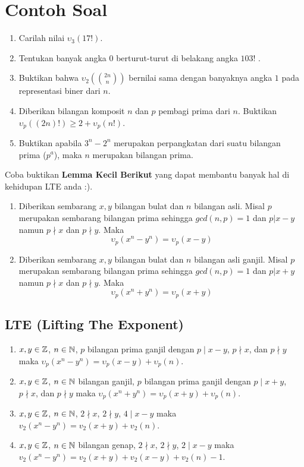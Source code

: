 \documentclass[12pt]{scrartcl}
\begin{document}
\section{Contoh Soal}
\begin{enumerate}
    \item Carilah nilai $\upsilon_3(17!)$.
    \item Tentukan banyak angka 0 berturut-turut di belakang angka $103!$ .
    \item Buktikan bahwa $\upsilon_2(\binom{2n}{n})$ bernilai sama dengan banyaknya angka $1$ pada representasi biner dari $n$.
    \item Diberikan bilangan komposit $n$ dan $p$ pembagi prima dari $n$. Buktikan $\upsilon_p((2n)!) \geq 2+\upsilon_p(n!)$.
    \item Buktikan apabila $3^n-2^n$ merupakan perpangkatan dari suatu bilangan prima ($p^a$), maka $n$ merupakan bilangan prima.
\end{enumerate}

Coba buktikan \textbf{Lemma Kecil Berikut} yang dapat membantu banyak hal di kehidupan LTE anda :).

\begin{enumerate}[resume]
    \item Diberikan sembarang $x,y$ bilangan bulat dan $n$ bilangan asli. Misal $p$ merupakan sembarang bilangan prima sehingga $gcd(n,p)=1$ dan $p|x-y$ namun $p\nmid x$ dan $p\nmid y$. Maka
    \[\upsilon_p(x^n-y^n) = \upsilon_p(x-y)\]
    \item Diberikan sembarang $x,y$ bilangan bulat dan $n$ bilangan asli ganjil. Misal $p$ merupakan sembarang bilangan prima sehingga $gcd(n,p)=1$ dan $p|x+y$ namun $p\nmid x$ dan $p\nmid y$. Maka
    \[\upsilon_p(x^n+y^n) = \upsilon_p(x+y)\]
\end{enumerate}

\subsection{LTE (Lifting The Exponent)}
\begin{enumerate}
    \item [Lemma 1] $x,y \in \mathbb Z$, $n \in \mathbb N$, $p$ bilangan prima ganjil dengan $p \mid x-y$, $p \nmid x$, dan $p \nmid y$ maka $\upsilon_p(x^n-y^n)=\upsilon_p(x-y)+\upsilon_p(n)$.
    \item [Lemma 2] $x,y \in \mathbb Z$, $n \in \mathbb N$ bilangan ganjil, $p$ bilangan prima ganjil dengan $p \mid x+y$, $p \nmid x$, dan $p \nmid y$ maka $\upsilon_p(x^n+y^n)=\upsilon_p(x+y)+\upsilon_p(n)$.
    \item [Lemma 3] $x,y \in \mathbb Z$, $n \in \mathbb N$, $2 \nmid x$, $2 \nmid y$,  $4 \mid x-y$  maka $v_2(x^n-y^n)=v_2(x+y)+v_2(n)$.
    \item [Lemma 4] $x,y \in \mathbb Z$, $n \in \mathbb N$ bilangan genap, $2 \nmid x$, $2 \nmid y$,  $2 \mid x-y$ maka $v_2(x^n-y^n)=v_2(x+y)+v_2(x-y)+v_2(n)-1$.
\end{enumerate}
\end{document}
